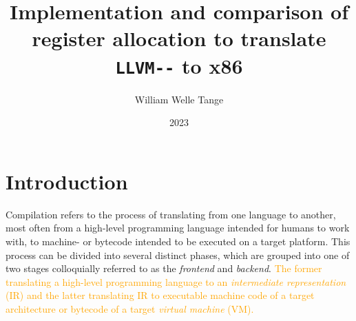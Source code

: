 \documentclass{article}
\title{Implementation and comparison of register allocation to translate \lstinline!LLVM--! to x86}
\author{William Welle Tange}
\date{2023}
\begin{document}
\maketitle

\tableofcontents
\newpage



    

\section{Introduction}

Compilation refers to the process of translating from one language to another, most often from a high-level programming language intended for humans to work with, to machine- or bytecode intended to be executed on a target platform. This process can be divided into several distinct phases, which are grouped into one of two stages colloquially referred to as the \textit{frontend} and \textit{backend}. \textcolor{orange}{The former translating a high-level programming language to an \textit{intermediate representation} (IR) and the latter translating IR to executable machine code of a target architecture or bytecode of a target \textit{virtual machine} (VM).}
\end{document}
